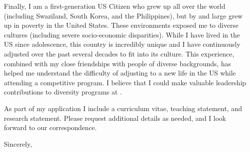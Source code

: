 \documentclass[11pt,a4paper]{letter}
\begin{document}
\begin{letter}
Finally, I am a first-generation US Citizen who grew up all over the world  (including Swaziland, South Korea, and the Philippines), but by and large grew up in poverty in the United States. These environments exposed me to diverse cultures (including severe socio-economic disparities). While I have lived in the US since adolescence, this country is incredibly unique and I have continuously adjusted over the past several decades to fit into its culture. This experience, combined with my close friendships with people of diverse backgrounds, has helped me understand the difficulty of adjusting to a new life in the US while attending a competitive program. I believe that I could make valuable leadership contributions to diversity programs at \School.


As part of my application I include a curriculum vitae, teaching statement, and research statement. Please request additional details as needed, and I look forward to our correspondence.


\closing{Sincerely,}
\end{letter}
\end{document}
